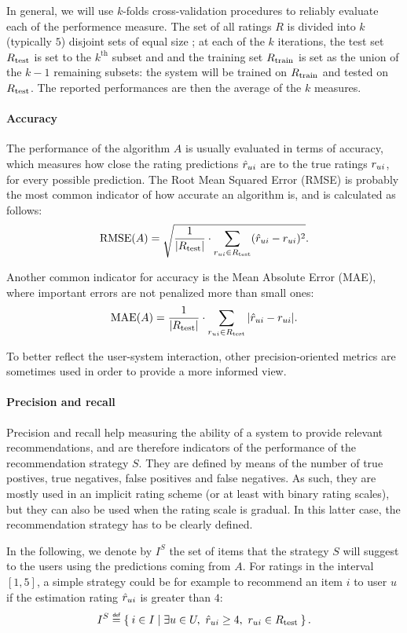 In general, we will use $k$-folds cross-validation procedures to reliably
evaluate each of the performence measure. The set of all ratings $R$ is divided
into $k$ (typically $5$) disjoint sets of equal size ; at each of the $k$ iterations, the test
set $R_{\text{test}}$ is set to the $k^{\text{th}}$ subset and and the training set
$R_{\text{train}}$ is set as the union of the $k - 1$ remaining subsets: the system will
be trained on $R_{\text{train}}$ and tested on $R_{\text{test}}$. The reported performances are
then the average of the $k$ measures.

\paragraph{Accuracy\\}
The performance of the algorithm $A$ is usually evaluated in terms of accuracy,
which measures how close the rating predictions $\hat{r}_{ui}$ are to the true
ratings $r_{ui}$, for every possible prediction. The Root Mean Squared Error
(RMSE) is probably the most common indicator of how accurate an algorithm is,
and is calculated as follows:
$$\text{RMSE}(A) = \sqrt{\frac{1}{|R_{\text{test}}|} \cdot \sum_{r_{ui} \in
R_{\text{test}}}(\hat{r}_{ui} - r_{ui})^2}.$$

Another common indicator for accuracy is the Mean Absolute Error (MAE), where
important errors are not penalized more than small ones:
$$\text{MAE}(A) = \frac{1}{|R_{\text{test}}|} \cdot \sum_{r_{ui} \in R_{\text{test}}}|\hat{r}_{ui} -
r_{ui}|.$$

To better reflect the user-system interaction, other precision-oriented metrics
are sometimes used in order to provide a more informed view.

\paragraph{Precision and recall\\}
Precision and recall help measuring the ability of a system to provide relevant
recommendations, and are therefore indicators of the performance of the
recommendation strategy $S$. They are defined by means of the number of true
postives, true negatives, false positives and false negatives. As such, they
are mostly used in an implicit rating scheme (or at least with binary rating
scales), but they can also be used when the rating scale is gradual. In this
latter case, the recommendation strategy has to be clearly defined.

In the following, we denote by $I^S$ the set of items that the strategy $S$
will suggest to the users using the predictions coming from $A$. For
ratings in the interval $[1, 5]$, a simple strategy could be for example to
recommend an item $i$ to user $u$ if the estimation rating $\hat{r}_{ui}$ is
greater than $4$:
$$I^S \eqdef \Set{i \in I | \exists u \in U, ~\predrui \geq 4,~ \rui \in \Rtest}.$$

